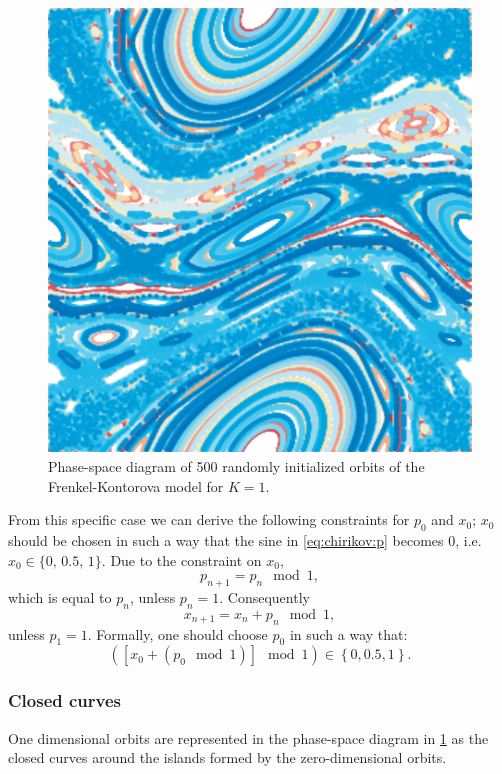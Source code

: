  	\begin{figure}
		\centering
		\includegraphics[width=0.9\columnwidth]{./img/assignment_a_pretty_low_res.pdf}
		\caption{Phase-space diagram of 500 randomly initialized orbits of the Frenkel-Kontorova model for $K = 1$.}
		\label{fig:a:pretty}
	\end{figure}

From this specific case we can derive the following constraints for $p_0$ and $x_0$; $x_0$ should be chosen in such a way that the sine in \cref{eq:chirikov:p} becomes 0, i.e. $x_0 \in \{0,\, 0.5,\, 1\}$. Due to the constraint on $x_0$,
\begin{equation*}
p_{n + 1} = p_{n} \mod 1,
\end{equation*}
	which is equal to $p_n$, unless $p_n = 1$. Consequently
	\begin{equation*}
	x_{n + 1} = x_n + p_n \mod 1,
	\end{equation*}
unless $p_1 = 1$. Formally, one should choose $p_0$ in such a way that:
\begin{equation*}
	\left( \left[ x_0 + (p_0 \mod 1)\right] \mod 1 \right) \in \left\{0, 0.5, 1\right\}.
\end{equation*}

\subsubsection{Closed curves}
\label{sss:experiment:a:closed}
One dimensional orbits are represented in the phase-space diagram in \cref{fig:a:pretty} as the closed curves around the islands formed by the zero-dimensional orbits.

